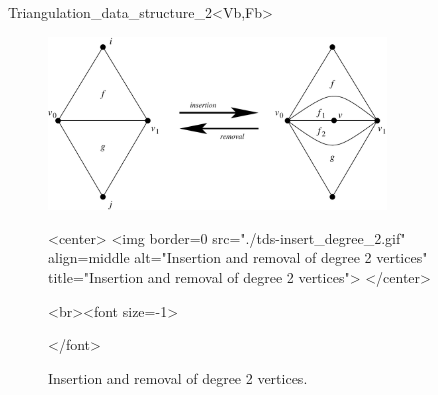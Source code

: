 \begin{ccRefClass}{Triangulation_data_structure_2<Vb,Fb>}
\begin{figure}[htb]
\begin{ccTexOnly}
\begin{center}
\includegraphics[width=0.8\textwidth]{TDS_2_ref/tds-insert_degree_2}
\end{center}
\end{ccTexOnly}
\begin{ccHtmlOnly}
<center>
<img border=0 src="./tds-insert_degree_2.gif" align=middle
alt="Insertion and removal of degree 2 vertices"
title="Insertion and removal of degree 2 vertices">
</center>
\end{ccHtmlOnly}
\begin{ccHtmlOnly}
<br><font size=-1>
\end{ccHtmlOnly}
\caption{Insertion and removal of degree 2 vertices.}
\label{fig-tds-ir-deg2}
\begin{ccHtmlOnly}
</font>
\end{ccHtmlOnly}
\end{figure}



\end{ccRefClass}


